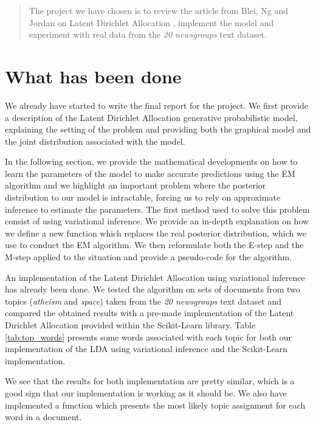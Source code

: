 \documentclass{article}
\begin{document}
\begin{abstract} 
The project we have chosen is to review the article from Blei, Ng and Jordan on Latent Dirichlet Allocation \cite{blei2003latent}, implement the model and experiment with real data from the \textit{20 newsgroups} text dataset.
\end{abstract} 


\section{What has been done}

We already have started to write the final report for the project. We first provide a description of the Latent Dirichlet Allocation generative probabilistic model, explaining the setting of the problem and providing both the graphical model and the joint distribution associated with the model.

In the following section, we provide the mathematical developments on how to learn the parameters of the model to make accurate predictions using the EM algorithm and we highlight an important problem where the posterior distribution to our model is intractable, forcing us to rely on approximate inference to estimate the parameters. The first method used to solve this problem consist of using variational inference. We provide an in-depth explanation on how we define a new function which replaces the real posterior distribution, which we use to conduct the EM algorithm. We then reformulate both the E-step and the M-step applied to the situation and provide a pseudo-code for the algorithm.

An implementation of the Latent Dirichlet Allocation using variational inference has already been done. We tested the algorithm on sets of documents from two topics (\textit{atheism} and \textit{space}) taken from the \textit{20 newsgroups} text dataset and compared the obtained results with a pre-made implementation of the Latent Dirichlet Allocation provided within the Scikit-Learn library. Table \ref{tab:top_words} presents some words associated with each topic for both our implementation of the LDA using variational inference and the Scikit-Learn implementation.

We see that the results for both implementation are pretty similar, which is a good sign that our implementation is working as it should be. We also have implemented a function which presents the most likely topic assignment for each word in a document.
\end{document}
